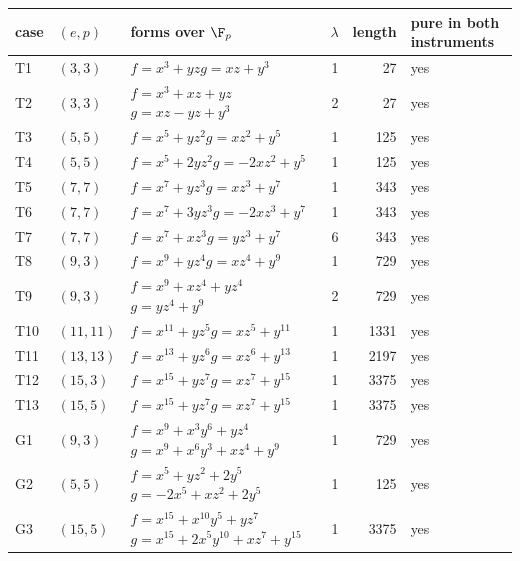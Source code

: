 \begin{tabular}{@{}ll>{\raggedright\arraybackslash}p{6.2cm}rrl@{}}
\toprule
case & $(e,p)$ & forms over $\F_p$ & $\lambda$ & length & pure in both instruments\\
\midrule
T1 & $(3,3)$ & $f=x^{3} + yz$\newline $g=xz + y^{3}$ & 1 & 27 & yes\\
T2 & $(3,3)$ & $f=x^{3} + xz + yz$\newline $g=xz - yz + y^{3}$ & 2 & 27 & yes\\
T3 & $(5,5)$ & $f=x^{5} + yz^{2}$\newline $g=xz^{2} + y^{5}$ & 1 & 125 & yes\\
T4 & $(5,5)$ & $f=x^{5} + 2yz^{2}$\newline $g=-2xz^{2} + y^{5}$ & 1 & 125 & yes\\
T5 & $(7,7)$ & $f=x^{7} + yz^{3}$\newline $g=xz^{3} + y^{7}$ & 1 & 343 & yes\\
T6 & $(7,7)$ & $f=x^{7} + 3yz^{3}$\newline $g=-2xz^{3} + y^{7}$ & 1 & 343 & yes\\
T7 & $(7,7)$ & $f=x^{7} + xz^{3}$\newline $g=yz^{3} + y^{7}$ & 6 & 343 & yes\\
T8 & $(9,3)$ & $f=x^{9} + yz^{4}$\newline $g=xz^{4} + y^{9}$ & 1 & 729 & yes\\
T9 & $(9,3)$ & $f=x^{9} + xz^{4} + yz^{4}$\newline $g=yz^{4} + y^{9}$ & 2 & 729 & yes\\
T10 & $(11,11)$ & $f=x^{11} + yz^{5}$\newline $g=xz^{5} + y^{11}$ & 1 & 1331 & yes\\
T11 & $(13,13)$ & $f=x^{13} + yz^{6}$\newline $g=xz^{6} + y^{13}$ & 1 & 2197 & yes\\
T12 & $(15,3)$ & $f=x^{15} + yz^{7}$\newline $g=xz^{7} + y^{15}$ & 1 & 3375 & yes\\
T13 & $(15,5)$ & $f=x^{15} + yz^{7}$\newline $g=xz^{7} + y^{15}$ & 1 & 3375 & yes\\
G1 & $(9,3)$ & $f=x^{9} + x^{3}y^{6} + yz^{4}$\newline $g=x^{9} + x^{6}y^{3} + xz^{4} + y^{9}$ & 1 & 729 & yes\\
G2 & $(5,5)$ & $f=x^{5} + yz^{2} + 2y^{5}$\newline $g=-2x^{5} + xz^{2} + 2y^{5}$ & 1 & 125 & yes\\
G3 & $(15,5)$ & $f=x^{15} + x^{10}y^{5} + yz^{7}$\newline $g=x^{15} + 2x^{5}y^{10} + xz^{7} + y^{15}$ & 1 & 3375 & yes\\
\bottomrule
\end{tabular}
